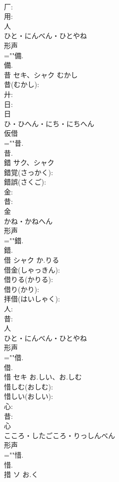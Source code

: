 \documentclass[8pt]{extreport}
\begin{document}
\begin{CJK}{UTF8}{min}
\\	厂: 
\\	用: 
\\	人	
\\	ひと・にんべん・ひとやね	
\\	形声 
\\	=""備.
\\	備.
\\	昔	セキ、シャク	むかし		
\\	昔(むかし): 
\\	廾: 
\\	日: 
\\	日	
\\	ひ・ひへん・にち・にちへん	
\\	仮借 
\\	=""昔.
\\	昔.
\\	錯	サク、シャク			
\\	錯覚(さっかく): 
\\	錯誤(さくご): 
\\	金: 
\\	昔: 
\\	金	
\\	かね・かねへん	
\\	形声 
\\	=""錯.
\\	錯.
\\	借	シャク	か.りる		
\\	借金(しゃっきん): 
\\	借りる(かりる): 
\\	借り(かり): 
\\	拝借(はいしゃく): 
\\	人: 
\\	昔: 
\\	人	
\\	ひと・にんべん・ひとやね	
\\	形声 
\\	=""借.
\\	借.
\\	惜	セキ	お.しい、お.しむ		
\\	惜しむ(おしむ): 
\\	惜しい(おしい): 
\\	心: 
\\	昔: 
\\	心	
\\	こころ・したごころ・りっしんべん	
\\	形声 
\\	=""惜.
\\	惜.
\\	措	ソ	お.く		

\end{CJK}
\end{document}
